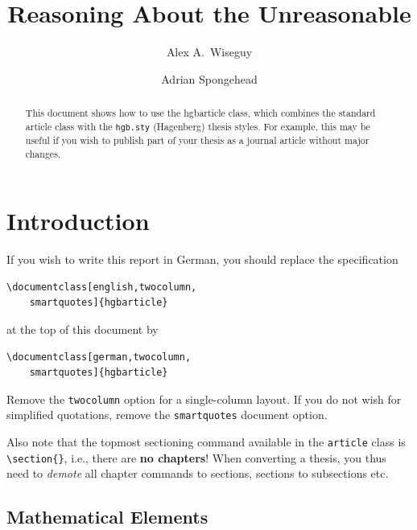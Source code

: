 \documentclass[english,twocolumn,smartquotes]{hgbarticle}
\author{
	Alex A.\ Wiseguy\\ 
	\email{wiseguy@gmail.com}
	\and
	Adrian Spongehead\\
	\email{spongehead@gmx.net}
}
\title{Reasoning About the Unreasonable}
\date{}
\begin{document}

\maketitle

\begin{abstract}\noindent
This document shows how to use the \textsf{hgbarticle} class, which combines
the standard \latex \textsf{article} class with the \texttt{hgb.sty}
(Hagenberg) thesis styles. For example, this may be useful if you wish to
publish part of your thesis as a journal article without major changes.
\end{abstract}


\section{Introduction}

If you wish to write this report in German, you should replace the specification
%
\begin{verbatim}
\documentclass[english,twocolumn,
    smartquotes]{hgbarticle}
\end{verbatim}
%
at the top of this document by
%
\begin{verbatim}
\documentclass[german,twocolumn,
    smartquotes]{hgbarticle}
\end{verbatim}
%
Remove the \texttt{twocolumn} option for a single-column layout. If you do not
wish for simplified quotations, remove the \texttt{smartquotes} document option.

Also note that the topmost sectioning command available in the \texttt{article}
class is \verb!\section{}!, i.e., there are \textbf{no chapters}!
When converting a thesis, you thus need to \emph{demote} all chapter commands to
sections, sections to subsections etc.

\subsection{Mathematical Elements}
\end{document}
